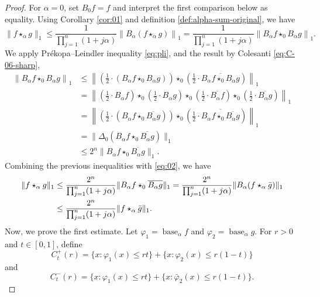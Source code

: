 \documentclass[11pt]{amsart}
\theoremstyle{plain}
\theoremstyle{definition}
\theoremstyle{remark}
\begin{document}
\begin{proof}
    For $\alpha=0$, set $B_0 f=f$ and interpret the first comparison below as equality.
    Using Corollary \ref{cor:01} and definition \eqref{def:alpha-sum-original}, we have
    \[
        \| f \star_\alpha g\|_1 \leq \frac{1}{\prod_{j=1}^n(1+j \alpha)}\left\|B_\alpha (f \star_\alpha g)\right\|_1
          = \frac{1}{\prod_{j=1}^n(1+j \alpha)}\left\|B_\alpha f  \star_0 B_\alpha g \right\|_1.
    \]
    We apply Pr\'ekopa--Leindler inequality  \eqref{eq:pli}, and the result by Colesanti \eqref{eq:C-06-sharp},
    \begin{align}
        \left\|B_\alpha f  \star_0 B_\alpha g \right\|_1
        &\leq
        \left\|\left(\frac{1}{2} \cdot (B_\alpha f  \star_0 B_\alpha g)\right) \star_0\left(\frac{1}{2} \cdot \overline{B_\alpha f  \star_0 B_\alpha g}\right)\right\|_1
        \\
        &=\left\| \left(\frac{1}{2} \cdot B_\alpha f \right) \star_0  \left(\frac{1}{2} \cdot B_\alpha g \right) \star_0 \left(\frac{1}{2} \cdot \overline{B_\alpha f} \right)\star_0 \left(\frac{1}{2} \cdot \overline{B_\alpha g}\right)\right\|_1
        \\
        &=\left\|\left(\frac{1}{2} \cdot (B_\alpha f  \star_0 \overline{B_\alpha g})\right) \star_0\left(\frac{1}{2} \cdot \overline{B_\alpha f  \star_0 \overline{B_\alpha g}}\right)\right\|_1
        \\
        &= \|\Delta_{0} \left( B_\alpha f  \star_0 \overline{B_\alpha g}\right)\|_1
        \\
        &\leq 2^n \|  B_\alpha f  \star_0 \overline{B_\alpha g}\|_1.
    \end{align}
    Combining the previous inequalities with \eqref{eq:02}, we have
    \begin{align}
        \| f \star_\alpha g\|_1 &\leq \frac{2^n}{\prod_{j=1}^n(1+j \alpha)}  \|  B_\alpha f  \star_0 \overline{B_\alpha g}\|_1
        = \frac{2^n}{\prod_{j=1}^n(1+j \alpha)}  \|  B_\alpha (f  \star_\alpha \Bar g)\|_1
        \\
        &\leq \frac{2^n}{\prod_{j=1}^n(1+j \alpha)}  \|  f  \star_\alpha \Bar g\|_1.
    \end{align}
    Now, we prove the first estimate. Let $\varphi_1=\operatorname{base}_\alpha f$ and $\varphi_2=\operatorname{base}_\alpha g$. For $r >0$ and $t \in [0,1]$,  define
    \[
        C_t^+(r) = \{x: \varphi_1(x) \leq rt\} + \{x: \varphi_2(x) \leq r(1-t)\}
    \]
    and
    \[
        C_t^-(r) = \{x: \varphi_1(x) \leq rt\} + \{x: \bar \varphi_2(x) \leq r(1-t)\}.
\]
\end{proof}
\end{document}

